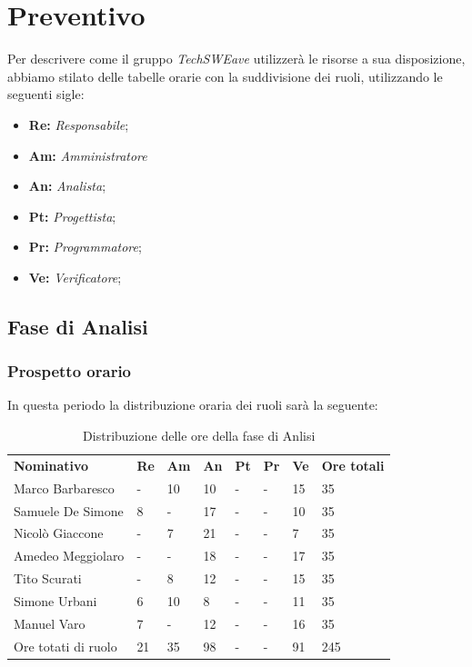 \section{Preventivo}
Per descrivere come il gruppo \emph{TechSWEave} utilizzerà le risorse a sua disposizione, abbiamo stilato delle tabelle orarie con la suddivisione dei ruoli, utilizzando le seguenti sigle:
\begin{itemize}
    \item \textbf{Re: }\emph{Responsabile};
    \item \textbf{Am: }\emph{Amministratore}
    \item \textbf{An: }\emph{Analista};
    \item \textbf{Pt: }\emph{Progettista};
    \item \textbf{Pr: }\emph{Programmatore};
    \item \textbf{Ve: }\emph{Verificatore};
\end{itemize}

\subsection{Fase di Analisi}
    \subsubsection{Prospetto orario}
    In questa periodo la distribuzione oraria dei ruoli sarà la seguente:
        \begin{center}
            \begin{table}[ht!]
                \centering
                \caption{Distribuzione delle ore della fase di Anlisi}
                \vspace{5px}
                \renewcommand{\arraystretch}{1.8}
                \begin{tabular}{p{100px} p{20px} p{20px} p{20px} p{20px} p{20px} p{20px} p{50px} }
                    \rowcolor{logo!70} \textbf{Nominativo} & \textbf{Re} & \textbf{Am} & \textbf{An} & \textbf{Pt} & \textbf{Pr} & \textbf{Ve} & \textbf{Ore totali}\\
                    Marco Barbaresco & - & 10 & 10 & - & - & 15 & 35\\
                    Samuele De Simone & 8 & - & 17 & - & - & 10 & 35\\
                    Nicolò Giaccone & - & 7 & 21 & - & - & 7 & 35\\
                    Amedeo Meggiolaro & - & - & 18 & - & - & 17 & 35\\
                    Tito Scurati & - & 8 & 12 & - & - & 15 & 35\\
                    Simone Urbani & 6 & 10 & 8 & - & - & 11 & 35\\
                    Manuel Varo & 7 & - & 12 & - & - & 16 & 35\\
                    Ore totati di ruolo & 21 & 35 & 98 & - & - & 91 & 245\\
                \end{tabular}
            \end{table}
        \end{center}

